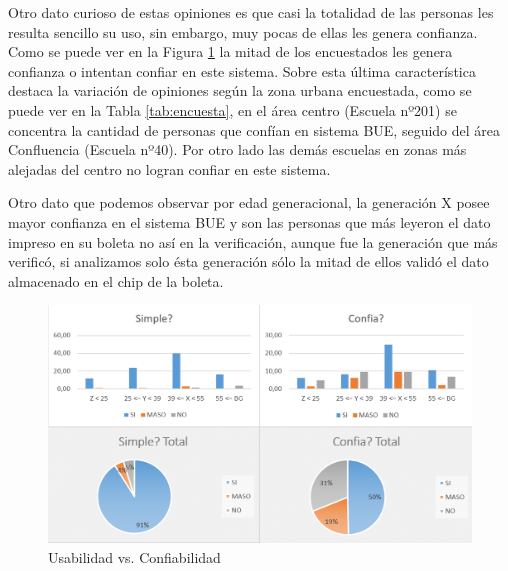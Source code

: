 
Otro dato curioso de estas opiniones es que casi la totalidad de las personas les resulta sencillo su uso, sin embargo, muy pocas de ellas les genera confianza. Como se puede ver en la Figura \ref{graf:votantesUsoConfia} la mitad de los encuestados les genera confianza o intentan confiar en este sistema. Sobre esta última característica destaca la variación de opiniones según la zona urbana encuestada, como se puede ver en la Tabla \ref{tab:encuesta}, en el área centro (Escuela nº201)  se concentra la cantidad de personas que confían en sistema BUE, seguido del área Confluencia (Escuela nº40). %
Por otro lado las demás escuelas en zonas más alejadas del centro no logran confiar en este sistema. 

Otro dato que podemos observar por edad generacional, la generación X posee mayor confianza en el sistema BUE y son las personas que más leyeron el dato impreso en su boleta no así en la verificación, aunque fue la generación que más verificó, si analizamos solo ésta generación sólo la mitad de ellos validó el dato almacenado en el chip de la boleta.

\begin{figure}[h!]
  \includegraphics[width=\textwidth]{img/GGEjN1UUOE.png}
  \caption{Usabilidad vs. Confiabilidad}
  \label{graf:votantesUsoConfia}
\end{figure}

